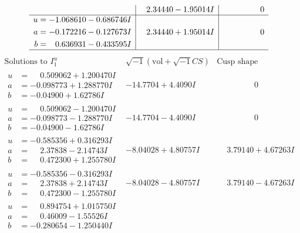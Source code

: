 \documentclass[1p]{elsarticle_modified}
\theoremstyle{definition}
\newcommand{\I}{\sqrt{-1}}
\begin{document}
$$\begin{array}{c|c|c}
 & \phantom{-}2.34440 - 1.95014 I & \phantom{-0.000000 } 0 \\ \hline\begin{aligned}
u &= -1.068610 - 0.686746 I \\
a &= -0.172216 - 0.127673 I \\
b &= \phantom{-}0.636931 - 0.433595 I\end{aligned}
 & \phantom{-}2.34440 + 1.95014 I & \phantom{-0.000000 } 0\\
 \hline 
 \end{array}$$\newpage$$\begin{array}{c|c|c}  
\text{Solutions to }I^u_{1}& \I (\text{vol} + \sqrt{-1}CS) & \text{Cusp shape}\\
 \hline 
\begin{aligned}
u &= \phantom{-}0.509062 + 1.200470 I \\
a &= -0.098773 + 1.288770 I \\
b &= -0.04900 + 1.62786 I\end{aligned}
 & -14.7704 + 4.4090 I & \phantom{-0.000000 } 0 \\ \hline\begin{aligned}
u &= \phantom{-}0.509062 - 1.200470 I \\
a &= -0.098773 - 1.288770 I \\
b &= -0.04900 - 1.62786 I\end{aligned}
 & -14.7704 - 4.4090 I & \phantom{-0.000000 } 0 \\ \hline\begin{aligned}
u &= -0.585356 + 0.316293 I \\
a &= \phantom{-}2.37838 - 2.14743 I \\
b &= \phantom{-}0.472300 + 1.255780 I\end{aligned}
 & -8.04028 + 4.80757 I & \phantom{-}3.79140 + 4.67263 I \\ \hline\begin{aligned}
u &= -0.585356 - 0.316293 I \\
a &= \phantom{-}2.37838 + 2.14743 I \\
b &= \phantom{-}0.472300 - 1.255780 I\end{aligned}
 & -8.04028 - 4.80757 I & \phantom{-}3.79140 - 4.67263 I \\ \hline\begin{aligned}
u &= \phantom{-}0.894754 + 1.015750 I \\
a &= \phantom{-}0.46009 - 1.55526 I \\
b &= -0.280654 - 1.250440 I\end{aligned}

\end{array}$$
\end{document}
